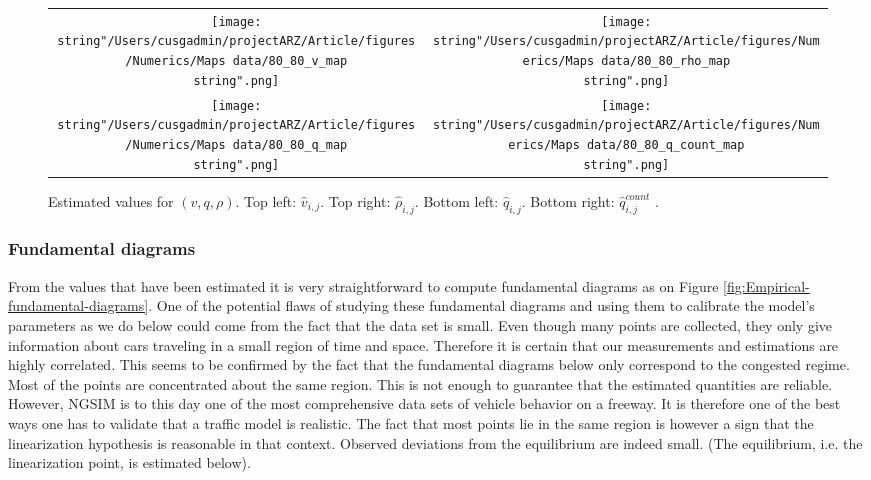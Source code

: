 \documentclass[preprint]{elsarticle}
\begin{document}
\begin{figure}
\begin{centering}
\begin{tabular}{cc}
\texttt{[image: \\string"/Users/cusgadmin/projectARZ/Article/figures/Numerics/Maps data/80\_80\_v\_map\\string".png]} & \texttt{[image: \\string"/Users/cusgadmin/projectARZ/Article/figures/Numerics/Maps data/80\_80\_rho\_map\\string".png]}\tabularnewline
\texttt{[image: \\string"/Users/cusgadmin/projectARZ/Article/figures/Numerics/Maps data/80\_80\_q\_map\\string".png]} & \texttt{[image: \\string"/Users/cusgadmin/projectARZ/Article/figures/Numerics/Maps data/80\_80\_q\_count\_map\\string".png]}\tabularnewline
\end{tabular}
\par\end{centering}

\protect\caption{Estimated values for $\left(v,q,\rho\right)$. Top left: $\widehat{v}_{i,j}$.
Top right: $\widehat{\rho}_{i,j}$. Bottom left: $\widehat{q}_{i,j}$.
Bottom right: $\widehat{q}_{i,j}^{count}$ .\label{fig:Estimated-values}}


\end{figure}



\subsubsection{Fundamental diagrams}

From the values that have been estimated it is very straightforward
to compute fundamental diagrams as on Figure \ref{fig:Empirical-fundamental-diagrams}.
One of the potential flaws of studying these fundamental diagrams
and using them to calibrate the model's parameters as we do below
could come from the fact that the data set is small. Even though many
points are collected, they only give information about cars traveling
in a small region of time and space. Therefore it is certain that
our measurements and estimations are highly correlated. This seems
to be confirmed by the fact that the fundamental diagrams below only
correspond to the congested regime. Most of the points are concentrated
about the same region. This is not enough to guarantee that the estimated
quantities are reliable. However, NGSIM is to this day one of the
most comprehensive data sets of vehicle behavior on a freeway. It
is therefore one of the best ways one has to validate that a traffic
model is realistic. The fact that most points lie in the same region
is however a sign that the linearization hypothesis is reasonable
in that context. Observed deviations from the equilibrium are indeed
small. (The equilibrium, i.e. the linearization point, is estimated
below).
\end{document}
